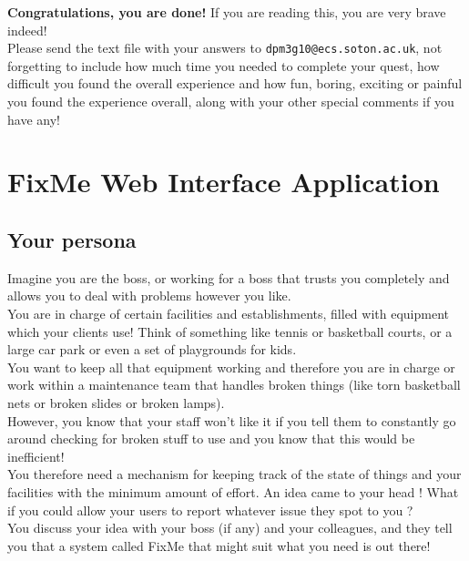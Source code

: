 \documentclass[12pt]{article}
\begin{document}
\vspace{5em}
\textbf{Congratulations, you are done!} If you are reading this, you are very brave indeed!\\

Please send the text file with your answers to \texttt{dpm3g10@ecs.soton.ac.uk}, not forgetting to include how much time you needed to complete your quest, how difficult you found the overall experience and how fun, boring, exciting or painful you found the experience overall, along with your other special comments if you have any!

\pagebreak
\section{FixMe Web Interface Application}
\subsection{Your persona}
Imagine you are the boss, or working for a boss that trusts you completely and allows you to deal with problems however you like. \\

You are in charge of certain facilities and establishments, filled with equipment which your clients use! Think of something like tennis or basketball courts, or a large car park or even a set of playgrounds for kids. \\

You want to keep all that equipment working and therefore you are in charge or work within a maintenance team that handles broken things (like torn basketball nets or broken slides or broken lamps). \\

However, you know that your staff won't like it if you tell them to constantly go around checking for broken stuff to use and you know that this would be inefficient!\\

You therefore need a mechanism for keeping track of the state of things and your facilities with the minimum amount of effort. An idea came to your head ! What if you could allow your users to report whatever issue they spot to you ?\\

You discuss your idea with your boss (if any) and your colleagues, and they tell you that a system called FixMe that might suit what you need is out there!\\
\end{document}
